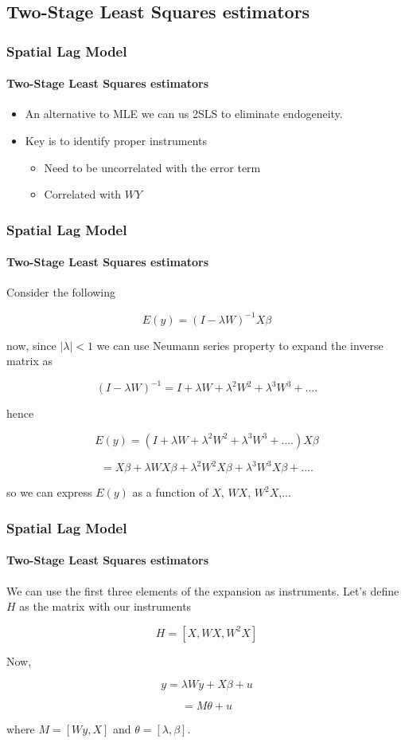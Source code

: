 \documentclass[
  shownotes,
  xcolor={svgnames},
  hyperref={colorlinks,citecolor=DarkBlue,linkcolor=DarkRed,urlcolor=DarkBlue}
  ]{beamer}
\begin{document}
\subsection{Two-Stage Least Squares estimators}
\begin{frame}[fragile]
\frametitle{Spatial Lag Model}
\framesubtitle{Two-Stage Least Squares estimators}

\begin{itemize}
\item An alternative to MLE we can us 2SLS to eliminate endogeneity.
\bigskip
\item Key is to identify proper instruments
\bigskip
\begin{itemize}
\item Need to be uncorrelated with the error term
\bigskip
\item Correlated with $WY$
\end{itemize}
\end{itemize}

\end{frame}
\begin{frame}[fragile]
\frametitle{Spatial Lag Model}
\framesubtitle{Two-Stage Least Squares estimators}
Consider the following

\[
E(y)=(I-\lambda W)^{-1}X\beta
\]

now, since $|\lambda|<1$ we can use Neumann series property to expand
the inverse matrix as 

\[
(I-\lambda W)^{-1}=I+\lambda W+\lambda^{2}W^{2}+\lambda^{3}W^{3}+....
\]

hence

\[
E(y)=(I+\lambda W+\lambda^{2}W^{2}+\lambda^{3}W^{3}+....)X\beta
\]

\[
=X\beta+\lambda WX\beta+\lambda^{2}W^{2}X\beta+\lambda^{3}W^{3}X\beta+....
\]

so we can express $E(y)$ as a function of $X$, $WX$, $W^{2}X$,... 


\end{frame}
\begin{frame}[fragile]
\frametitle{Spatial Lag Model}
\framesubtitle{Two-Stage Least Squares estimators}

We can use the first three elements of the expansion as instruments.
Let's define $H$ as the matrix with our instruments 

\[
H=[X,WX,W^{2}X]
\]

Now, 

\[
y=\lambda Wy+X\beta+u
\]

\[
=M\theta+u
\]

\medskip
where $M=[Wy,X]$ and $\theta=[\lambda,\beta]$. 

\end{frame}
\end{document}
